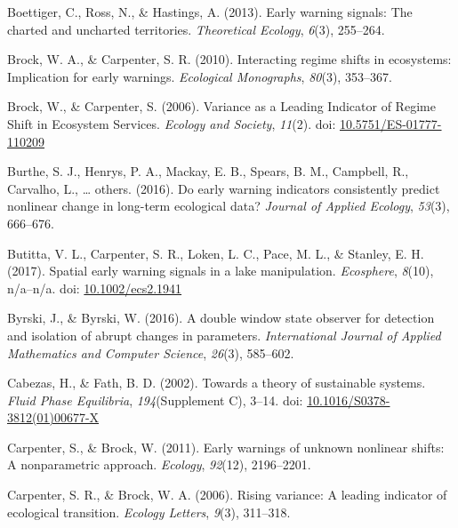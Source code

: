 \documentclass[12pt,twoside,openany]{reedthesis}
\begin{document}
\leavevmode\hypertarget{ref-boettiger_early_2013}{}%
Boettiger, C., Ross, N., \& Hastings, A. (2013). Early warning signals: The charted and uncharted territories. \emph{Theoretical Ecology}, \emph{6}(3), 255--264.

\leavevmode\hypertarget{ref-brock2010interacting}{}%
Brock, W. A., \& Carpenter, S. R. (2010). Interacting regime shifts in ecosystems: Implication for early warnings. \emph{Ecological Monographs}, \emph{80}(3), 353--367.

\leavevmode\hypertarget{ref-brock_variance_2006}{}%
Brock, W., \& Carpenter, S. (2006). Variance as a Leading Indicator of Regime Shift in Ecosystem Services. \emph{Ecology and Society}, \emph{11}(2). doi: \href{https://doi.org/10.5751/ES-01777-110209}{10.5751/ES-01777-110209}

\leavevmode\hypertarget{ref-burthe2016early}{}%
Burthe, S. J., Henrys, P. A., Mackay, E. B., Spears, B. M., Campbell, R., Carvalho, L., \ldots{} others. (2016). Do early warning indicators consistently predict nonlinear change in long-term ecological data? \emph{Journal of Applied Ecology}, \emph{53}(3), 666--676.

\leavevmode\hypertarget{ref-butitta_spatial_2017}{}%
Butitta, V. L., Carpenter, S. R., Loken, L. C., Pace, M. L., \& Stanley, E. H. (2017). Spatial early warning signals in a lake manipulation. \emph{Ecosphere}, \emph{8}(10), n/a--n/a. doi: \href{https://doi.org/10.1002/ecs2.1941}{10.1002/ecs2.1941}

\leavevmode\hypertarget{ref-byrski2016double}{}%
Byrski, J., \& Byrski, W. (2016). A double window state observer for detection and isolation of abrupt changes in parameters. \emph{International Journal of Applied Mathematics and Computer Science}, \emph{26}(3), 585--602.

\leavevmode\hypertarget{ref-cabezas_towards_2002}{}%
Cabezas, H., \& Fath, B. D. (2002). Towards a theory of sustainable systems. \emph{Fluid Phase Equilibria}, \emph{194}(Supplement C), 3--14. doi: \href{https://doi.org/10.1016/S0378-3812(01)00677-X}{10.1016/S0378-3812(01)00677-X}

\leavevmode\hypertarget{ref-carpenterBrock2011early}{}%
Carpenter, S., \& Brock, W. (2011). Early warnings of unknown nonlinear shifts: A nonparametric approach. \emph{Ecology}, \emph{92}(12), 2196--2201.

\leavevmode\hypertarget{ref-carpenter2006rising}{}%
Carpenter, S. R., \& Brock, W. A. (2006). Rising variance: A leading indicator of ecological transition. \emph{Ecology Letters}, \emph{9}(3), 311--318.
\end{document}
